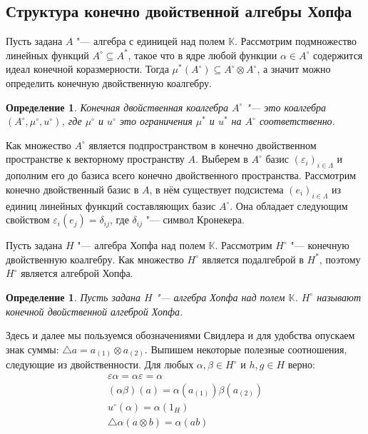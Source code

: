 \documentclass[12pt, reqno, a4paper, oneside, notitlepage]{amsart}
\theoremstyle{mytheoremstyle}
\theoremstyle{myremarkstyle}
\newtheorem{definition}[theorem]{Определение}
\numberwithin{equation}{section}
\begin{document}
\newpage

\subsection{Структура конечно двойственной алгебры Хопфа}

Пусть задана $A$ "--- алгебра с единицей над полем $\mathbb{K}$. Рассмотрим подмножество линейных функций $A^\circ \subseteq A^*$, такое что в ядре любой функции $\alpha \in A^\circ$ содержится идеал конечной коразмерности. Тогда $\mu^*(A^\circ) \subseteq A^\circ \otimes A^\circ$, а значит можно определить конечную двойственную коалгебру.

\begin{definition}
    Конечная двойственная коалгебра $A^\circ$ "--- это коалгебра $(A^\circ, \mu^\circ, u^\circ)$, где $\mu^\circ$ и $u^\circ$ это ограничения $\mu^*$ и $u^*$ на $A^\circ$ соответственно.
\end{definition}

Как множество $A^\circ$ является подпространством в конечно двойственном пространстве к векторному пространству $A$. 
Выберем в $A^\circ$ базис $(\varepsilon_i)_{i \in \Lambda}$ и дополним его до базиса всего конечно двойственного пространства.
Рассмотрим конечно двойственный базис в $A$, в нём существует подсистема $(e_i)_{i \in \Lambda}$ из единиц линейных функций составляющих базис $A^\circ$. Она обладает следующим свойством $\varepsilon_i(e_j) = \delta_{ij}$, где $\delta_{ij}$ "--- символ Кронекера.

Пусть задана $H$ "--- алгебра Хопфа над полем $\mathbb{K}$. Рассмотрим $H^\circ$ "--- конечную двойственную коалгебру. Как множество $H^\circ$ является подалгеброй в $H^*$, поэтому $H^\circ$ является алгеброй Хопфа.

\begin{definition}
    Пусть задана $H$ "--- алгебра Хопфа над полем $\mathbb{K}$. $H^\circ$ называют конечной двойственной алгеброй Хопфа.
\end{definition}

Здесь и далее мы пользуемся обозначениями Свидлера и для удобства опускаем знак суммы: $\bigtriangleup a = a_{(1)} \otimes a_{(2)}$. 
Выпишем некоторые полезные соотношения, следующие из двойственности. Для любых $\alpha, \beta \in H^\circ$ и $h, g \in H$ верно:
\begin{eqnarray}
    \varepsilon\alpha = \alpha\varepsilon = \alpha \label{str1}\\
    (\alpha\beta)(a) = \alpha(a_{(1)})\beta(a_{(2)}) \label{str2}\\
    u^\circ(\alpha) = \alpha(1_H) \label{str3}\\
    \bigtriangleup\alpha(a \otimes b) = \alpha(ab) \label{str4}
\end{eqnarray}
\end{document}

